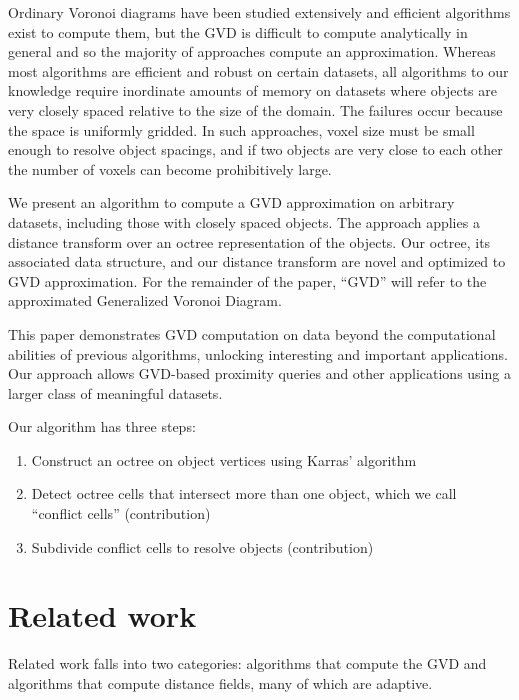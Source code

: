 \documentclass{egpubl}
\begin{document}
Ordinary Voronoi diagrams have been studied extensively and efficient algorithms exist to compute them, but the GVD is difficult to compute analytically in general \cite{boissonnat2006curved,hoff1999fast} and so the majority of approaches compute an approximation.  Whereas most algorithms are efficient and robust on certain datasets, all algorithms to our knowledge require inordinate amounts of memory on datasets where objects are very closely spaced relative to the size of the domain.  The failures occur because the space is uniformly gridded.  In such approaches, voxel size must be small enough to resolve object spacings, and if two objects are very close to each other the number of voxels can become prohibitively large.

We present an algorithm to compute a GVD approximation on arbitrary datasets, including those with closely spaced objects.  The approach applies a distance transform over an octree representation of the objects.  Our octree, its associated data structure, and our distance transform are novel and optimized to GVD approximation. For the remainder of the paper, ``GVD'' will refer to the approximated Generalized Voronoi Diagram.

This paper demonstrates GVD computation on data beyond the computational abilities of previous algorithms, unlocking interesting and important applications.  Our approach allows GVD-based proximity queries and other applications using a larger class of meaningful datasets.


Our algorithm has three steps:

\begin{enumerate}
\item Construct an octree on object vertices using Karras' algorithm \cite{karras2012maximizing}
\item Detect octree cells that intersect more than one object, which we call ``conflict cells'' (contribution)
\item Subdivide conflict cells to resolve objects (contribution)
\end{enumerate}

\section{Related work}
Related work falls into two categories: algorithms that compute the GVD and algorithms that compute distance fields, many of which are adaptive.
\end{document}
